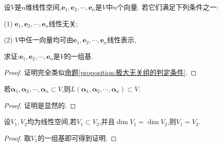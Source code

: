 \documentclass[../../main.tex]{subfiles}%
\begin{document}
\begin{proposition}
设\(V\)是\(n\)维线性空间,\(\boldsymbol{e}_1,\boldsymbol{e}_2,\cdots,\boldsymbol{e}_n\)是\(V\)中\(n\)个向量. 若它们满足下列条件之一:

(1) \(\boldsymbol{e}_1,\boldsymbol{e}_2,\cdots,\boldsymbol{e}_n\)线性无关;

(2) \(V\)中任一向量均可由\(\boldsymbol{e}_1,\boldsymbol{e}_2,\cdots,\boldsymbol{e}_n\)线性表示,

求证:\(\boldsymbol{e}_1,\boldsymbol{e}_2,\cdots,\boldsymbol{e}_n\)是\(V\)的一组基.
\end{proposition}
\begin{proof}
证明完全类似\hyperref[proposition:极大无关组的判定条件]{命题\ref{proposition:极大无关组的判定条件}}.
\end{proof}

\begin{proposition}\label{proposition:包含所有向量的空间也包含这些向量张成的空间}
若$\boldsymbol{\alpha }_1,\boldsymbol{\alpha }_2,\cdots ,\boldsymbol{\alpha }_n\subset V$,则$L\left( \boldsymbol{\alpha }_1,\boldsymbol{\alpha }_2,\cdots ,\boldsymbol{\alpha }_n \right) \subset V$.
\end{proposition}
\begin{proof}
证明是显然的.
\end{proof}

\begin{proposition}\label{proposition:与全空间维数相同的子空间等于全空间}
设\(V_1,V_2\)均为线性空间,若\(V_1\subset V_2\),并且\(\dim V_1 = \dim V_2\),则\(V_1 = V_2\).
\end{proposition}
\begin{proof}
取$V_1$的一组基即可得到证明.
\end{proof}
\end{document}
